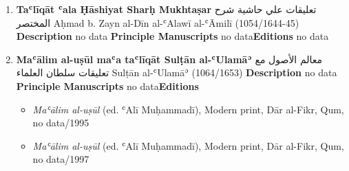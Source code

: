 \documentclass{article}
\begin{document}
\begin{enumerate}
      \item \textbf{Taʿlīqāt ʿala Ḥāshiyat Sharḥ Mukhtaṣar}
        \newline
        \textarabic{تعليقات علي حاشية شرح المختصر}
        \newline
        Aḥmad b. Zayn al-Dīn al-ʿAlawī al-ʿĀmilī
        \newline
        (1054/1644-45)
        \newline
        \newline
        \textbf{Description}
        \newline	
        no data
        \newline
        \newline
    \textbf{Principle Manuscripts}
\newline
no data\newline\textbf{Editions}
\newline
no data\newline
      \item \textbf{Maʿālim al-uṣūl maʿa taʿlīqāt Sulṭān al-ʿUlamāʾ}
        \newline
        \textarabic{معالم الأصول مع تعليقات سلطان العلماء}
        \newline
        Sulṭān al-ʿUlamāʾ
        \newline
        (1064/1653)
        \newline
        \newline
        \textbf{Description}
        \newline	
        no data
        \newline
        \newline
    \textbf{Principle Manuscripts}
\newline
no data\newline\textbf{Editions}
\begin{itemize}
        \item \emph{Maʿālim al-uṣūl} (ed. ʿAlī Muḥammadī), Modern print, Dār al-Fikr, Qum, no data/1995
        
        \item \emph{Maʿālim al-uṣūl} (ed. ʿAlī Muḥammadī), Modern print, Dār al-Fikr, Qum, no data/1997
        \end{itemize}


\end{enumerate}
\end{document}
